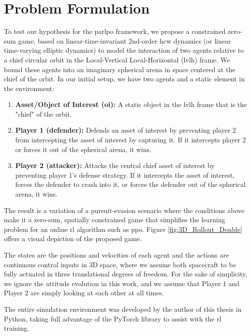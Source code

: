 \chapter{Problem Formulation}
\label{chap:Problem_Formulation}

To test our hypothesis for the \acs{parlpo} framework, we propose a constrained zero-sum game, based on linear-time-invariant 2nd-order \acs{hcw} dynamics (or linear time-varying elliptic dynamics) to model the interaction of two agents relative to a chief circular orbit in the Local-Vertical Local-Horizontal (\acs{lvlh}) frame. We bound these agents into an imaginary spherical arena in space centered at the chief of the orbit. In our initial setup, we have two agents and a static element in the environment:

\begin{enumerate}
\item \textbf{Asset/Object of Interest (\acs{oi}):} A static object in the \acs{lvlh} frame that is the "chief" of the orbit. 
\item \textbf{Player 1 (defender):} Defends an asset of interest by preventing player 2 from intercepting the asset of interest by capturing it. If it intercepts player 2 or forces it out of the spherical arena, it wins. 
\item \textbf{Player 2 (attacker):} Attacks the central chief asset of interest by preventing player 1's defense strategy. If it intercepts the asset of interest, forces the defender to crash into it, or forces the defender out of the spherical arena, it wins.
\end{enumerate}

The result is a variation of a pursuit-evasion scenario where the conditions above make it a zero-sum, spatially constrained game that simplifies the learning problem for an online \acs{rl} algorithm such as \acs{ppo}. Figure \ref{fig:3D_Rollout_Double} offers a visual depiction of the proposed game.

The states are the positions and velocities of each agent and the actions are continuous control inputs in 3D space, where we assume both spacecraft to be fully actuated in three translational degrees of freedom. For the sake of simplicity, we ignore the attitude evolution in this work, and we assume that Player 1 and Player 2 are simply looking at each other at all times.

The entire simulation environment was developed by the author of this thesis in Python, taking full advantage of the PyTorch library to assist with the \acs{rl} training. 

